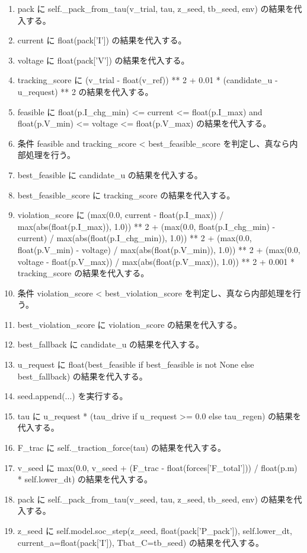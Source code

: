 \documentclass[a4paper,11pt]{article}
\begin{document}
\begin{enumerate}[leftmargin=1.8em]
\item     pack に self.\_pack\_from\_tau(v\_trial, tau, z\_seed, tb\_seed, env) の結果を代入する。
\item     current に float(pack['I']) の結果を代入する。
\item     voltage に float(pack['V']) の結果を代入する。
\item     tracking\_score に (v\_trial - float(v\_ref)) ** 2 + 0.01 * (candidate\_u - u\_request) ** 2 の結果を代入する。
\item     feasible に float(p.I\_chg\_min) <= current <= float(p.I\_max) and float(p.V\_min) <= voltage <= float(p.V\_max) の結果を代入する。
\item     条件 feasible and tracking\_score < best\_feasible\_score を判定し、真なら内部処理を行う。
\item       best\_feasible に candidate\_u の結果を代入する。
\item       best\_feasible\_score に tracking\_score の結果を代入する。
\item     violation\_score に (max(0.0, current - float(p.I\_max)) / max(abs(float(p.I\_max)), 1.0)) ** 2 + (max(0.0, float(p.I\_chg\_min) - current) / max(abs(float(p.I\_chg\_min)), 1.0)) ** 2 + (max(0.0, float(p.V\_min) - voltage) / max(abs(float(p.V\_min)), 1.0)) ** 2 + (max(0.0, voltage - float(p.V\_max)) / max(abs(float(p.V\_max)), 1.0)) ** 2 + 0.001 * tracking\_score の結果を代入する。
\item     条件 violation\_score < best\_violation\_score を判定し、真なら内部処理を行う。
\item       best\_violation\_score に violation\_score の結果を代入する。
\item       best\_fallback に candidate\_u の結果を代入する。
\item   u\_request に float(best\_feasible if best\_feasible is not None else best\_fallback) の結果を代入する。
\item   seed.append(...) を実行する。
\item   tau に u\_request * (tau\_drive if u\_request >= 0.0 else tau\_regen) の結果を代入する。
\item   F\_trac に self.\_traction\_force(tau) の結果を代入する。
\item   v\_seed に max(0.0, v\_seed + (F\_trac - float(forces['F\_total'])) / float(p.m) * self.lower\_dt) の結果を代入する。
\item   pack に self.\_pack\_from\_tau(v\_seed, tau, z\_seed, tb\_seed, env) の結果を代入する。
\item   z\_seed に self.model.soc\_step(z\_seed, float(pack['P\_pack']), self.lower\_dt, current\_a=float(pack['I']), Tbat\_C=tb\_seed) の結果を代入する。

\end{enumerate}
\end{document}
